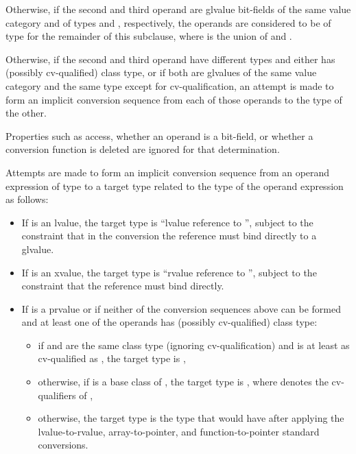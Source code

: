\pnum
Otherwise, if the second and third operand are glvalue bit-fields
of the same value category and
of types   and  , respectively,
the operands are considered to be of type \cv{} 
for the remainder of this subclause,
where \cv{} is the union of  and .

\pnum
Otherwise, if the second and third operand have different types and
either has (possibly cv-qualified) class type, or if both
are glvalues of the same value category and the same type except for
cv-qualification, an attempt is made to
form an implicit conversion sequence from
each of those operands to the type of the other.
\begin{note}
Properties such as access, whether an operand is a bit-field, or whether
a conversion function is deleted are ignored for that determination.
\end{note}
Attempts are made to form an implicit conversion sequence
from an operand expression  of type 
to a target type related to the type 
of the operand expression  as follows:

\begin{itemize}
\item If  is an lvalue, the target type is
``lvalue reference to '', subject to the
constraint that in the conversion the reference must bind
directly to a glvalue.

\item If  is an xvalue, the target type is
``rvalue reference to '',
subject to the constraint that the reference must bind directly.

\item If  is a prvalue or if neither of the conversion sequences above can be
formed and at least one of the operands has (possibly cv-qualified) class type:
\begin{itemize}
\item if  and  are the same class type
(ignoring cv-qualification) and
 is at least as cv-qualified as ,
the target type is ,

\item otherwise, if  is a base class of ,
the target type is  , where 
denotes the cv-qualifiers of ,

\item otherwise, the target type is the type that  would have
after applying the
lvalue-to-rvalue,
array-to-pointer, and
function-to-pointer
standard conversions.
\end{itemize}
\end{itemize}

